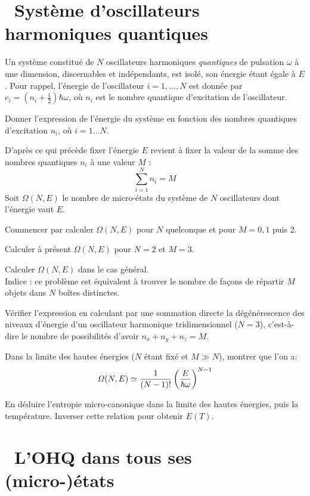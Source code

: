 \documentclass[utf8, 11pt]{feuille}
\begin{document}




\section{\medium~Système d'oscillateurs harmoniques quantiques}

Un système constitué de $N$ oscillateurs harmoniques {\it quantiques} de pulsation $\omega$ à une dimension, discernables et indépendants, est isolé, son énergie étant égale à $E$. Pour rappel, l'énergie de l'oscillateur $i=1,\dots,N$ est donnée par $e_i=(n_i+\frac{1}{2})\hbar \omega$, où $n_i$ est le nombre quantique d'excitation de l'oscillateur.

\question
Donner l'expression de l'énergie du système en fonction des nombres quantiques d'excitation $n_i$, où $i=1\dots N$.

\medskip
D'après ce qui précède fixer l'énergie $E$ revient à fixer la valeur de la somme des nombres quantiques $n_i$ à une valeur
$M$ :
$$
\sum_{i=1}^N n_i=M
$$
Soit $\varOmega(N,E)$ le nombre de micro-états du système de $N$ oscillateurs dont l'énergie vaut $E$.
 
\question
Commencer par calculer $\varOmega(N,E)$ pour $N$ quelconque et pour $M=0,1$ puis 2.

\question
Calculer à présent $\varOmega(N,E)$ pour $N=2$ et $M=3$.
	
\question
Calculer $\varOmega(N,E)$ dans le cas général.\\
Indice : ce problème est équivalent à trouver le nombre de façons de répartir $M$ objets dans $N$ boîtes distinctes.

\question
Vérifier l'expression en calculant par une sommation directe la dégénérescence des niveaux d'énergie d'un oscillateur harmonique tridimensionnel ($N=3$), c'est-à-dire le nombre de possibilités d'avoir $n_x+n_y+n_z=M$.

\question
Dans la limite des hautes énergies ($N$ étant fixé et $M \gg N$), montrer que l'on a:
$$
\varOmega(N,E)\simeq {1\over (N-1)!}\left({E\over \hbar  \omega}\right)^{N-1}
$$

\question
En déduire l'entropie micro-canonique dans la limite des hautes énergies, puis la température. Inverser cette relation pour obtenir $E(T)$.


\section{\medium~L'OHQ dans tous ses (micro-)états}
\end{document}
